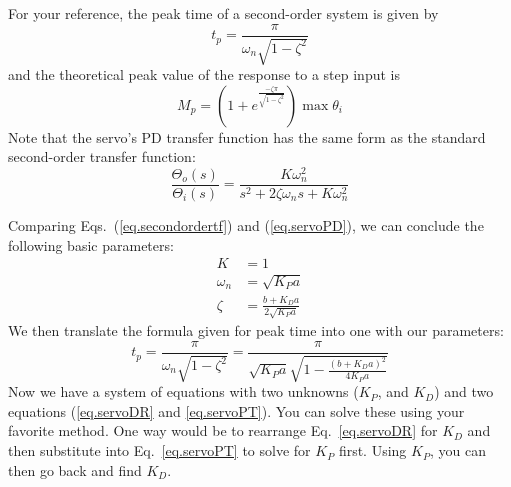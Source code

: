 \begin{enumerate}
\begin{itemize}
    \end{itemize}
    For your reference, the peak time of a second-order system is given by
    \begin{equation}
        t_p = \frac{\pi}{\omega_n \sqrt{1-\zeta^2}}
    \end{equation}
    and the theoretical peak value of the response to a step input is
    \begin{equation}
        M_p = \left(1 + e^{\frac{
                                -\zeta \pi
                                }{
                                \sqrt{1-\zeta^2}
                                }
                                }
                \right) \max \theta_i
    \end{equation}
    Note that the servo's PD transfer function has the same form as the standard second-order transfer function:
    \begin{equation}
        \frac{\Theta_o(s)}{\Theta_i(s)}
        =
        \frac{
                K\omega_n^2
                }{
                s^2 + 2\zeta\omega_n s + K\omega_n^2
                }
            \label{eq.secondordertf}
    \end{equation}
        \begin{solposcon}
        Comparing Eqs.\ (\ref{eq.secondordertf}) and (\ref{eq.servoPD}), we can conclude the following basic parameters:
        \begin{subequations}
        \begin{flalign}
        K &= 1 \\
        \omega_n &= \sqrt{K_P a} \\
        \zeta &= \frac{b+K_D a}{2\sqrt{K_P a}} \label{eq.servoDR}
        \end{flalign}
        \end{subequations}
        We then translate the formula given for peak time into one with our parameters:
        \begin{equation}
        t_p =  \frac{\pi}{\omega_n \sqrt{1-\zeta^2}}
        = \frac{
                \pi
                }{
                \sqrt{K_P a}\sqrt{1-\frac{
                                        (b+K_D a)^2
                                        }{
                                        4K_P a
                                        }
                                        }
                }
            \label{eq.servoPT}
        \end{equation}
        Now we have a system of equations with two unknowns ($K_P$, and $K_D$) and two equations (\ref{eq.servoDR} and \ref{eq.servoPT}).  You can solve these using your favorite method.  One way would be to rearrange Eq.\ \ref{eq.servoDR} for $K_D$ and then substitute into Eq.\ \ref{eq.servoPT} to solve for $K_P$ first.  Using $K_P$, you can then go back and find $K_D$.

\end{solposcon}
\end{enumerate}
